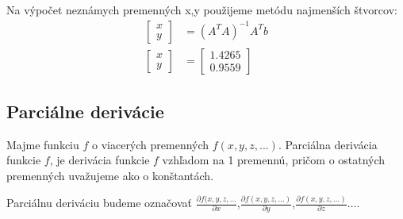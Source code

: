 \documentclass[../main.tex]{subfiles}
\begin{document}
Na výpočet neznámych premenných x,y použijeme metódu najmenších štvorcov:
\begin{equation}
	\begin{aligned}
	\begin{bmatrix}x \\y \end{bmatrix} &=  (A^TA)^{-1}A^Tb\\
	\begin{bmatrix}x \\y \end{bmatrix} &=  \begin{bmatrix} 1.4265 \\0.9559\end{bmatrix}
	\end{aligned}
	\label{eqn:MNS}
\end{equation}

\subsection{Parciálne derivácie}
Majme funkciu $f$ o viacerých premenných $f(x,y,z, ...)$. Parciálna derivácia funkcie $f$, je derivácia funkcie $f$ vzhľadom na 1 premennú, pričom o ostatných premenných uvažujeme ako o konštantách.

Parciálnu deriváciu budeme označovať $\frac{\partial f(x,y,z,\dots}{\partial x}$,$\frac{\partial f(x,y,z,\dots)}{\partial y}$,$\frac{\partial f(x,y,z,\dots)}{\partial z} \dots$.
\end{document}
